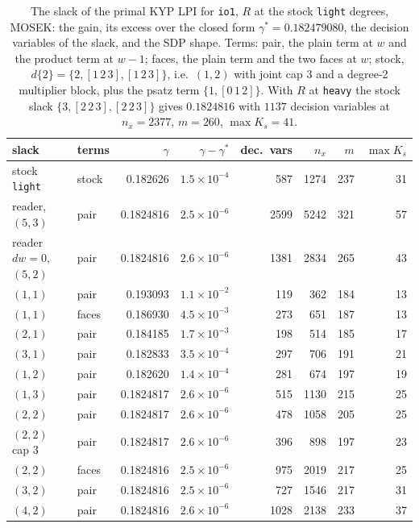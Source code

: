 \documentclass[12pt]{article}
\newcommand{\code}[1]{\texttt{#1}}
\theoremstyle{plain}
\theoremstyle{definition}
\theoremstyle{remark}
\begin{document}
\begin{table}[h]\centering\footnotesize
\setlength{\tabcolsep}{5pt}
\begin{tabular}{llrrrrrr}
\toprule
slack & terms & $\gamma$ & $\gamma-\gamma^*$ & dec.\ vars & $n_x$ & $m$ & $\max K_s$ \\
\midrule
stock \code{light} & stock & 0.182626 & $1.5\times10^{-4}$ & 587 & 1274 & 237 & 31 \\
reader, $(5,3)$ & pair & 0.1824816 & $2.5\times10^{-6}$ & 2599 & 5242 & 321 & 57 \\
reader $dw=0$, $(5,2)$ & pair & 0.1824816 & $2.6\times10^{-6}$ & 1381 & 2834 & 265 & 43 \\
$(1,1)$ & pair & 0.193093 & $1.1\times10^{-2}$ & 119 & 362 & 184 & 13 \\
$(1,1)$ & faces & 0.186930 & $4.5\times10^{-3}$ & 273 & 651 & 187 & 13 \\
$(2,1)$ & pair & 0.184185 & $1.7\times10^{-3}$ & 198 & 514 & 185 & 17 \\
$(3,1)$ & pair & 0.182833 & $3.5\times10^{-4}$ & 297 & 706 & 191 & 21 \\
$(1,2)$ & pair & 0.182620 & $1.4\times10^{-4}$ & 281 & 674 & 197 & 19 \\
$(1,3)$ & pair & 0.1824817 & $2.6\times10^{-6}$ & 515 & 1130 & 215 & 25 \\
$(2,2)$ & pair & 0.1824817 & $2.6\times10^{-6}$ & 478 & 1058 & 205 & 25 \\
$(2,2)$ cap 3 & pair & 0.1824817 & $2.6\times10^{-6}$ & 396 & 898 & 197 & 23 \\
$(2,2)$ & faces & 0.1824816 & $2.5\times10^{-6}$ & 975 & 2019 & 217 & 25 \\
$(3,2)$ & pair & 0.1824816 & $2.5\times10^{-6}$ & 727 & 1546 & 217 & 31 \\
$(4,2)$ & pair & 0.1824816 & $2.6\times10^{-6}$ & 1028 & 2138 & 233 & 37 \\
\bottomrule
\end{tabular}
\caption{The slack of the primal KYP LPI for \code{io1}, $R$ at the stock \code{light} degrees, MOSEK: the gain, its excess over the closed form $\gamma^*=0.182479080$, the decision variables of the slack, and the SDP shape. Terms: pair, the plain term at $w$ and the product term at $w-1$; faces, the plain term and the two faces at $w$; stock, $d\{2\}=\{2,[1\,2\,3],[1\,2\,3]\}$, i.e.\ $(1,2)$ with joint cap $3$ and a degree-2 multiplier block, plus the psatz term $\{1,[0\,1\,2]\}$. With $R$ at \code{heavy} the stock slack $\{3,[2\,2\,3],[2\,2\,3]\}$ gives $0.1824816$ with $1137$ decision variables at $n_x=2377$, $m=260$, $\max K_s=41$.}\label{tab:hinf1d}
\end{table}
\end{document}
